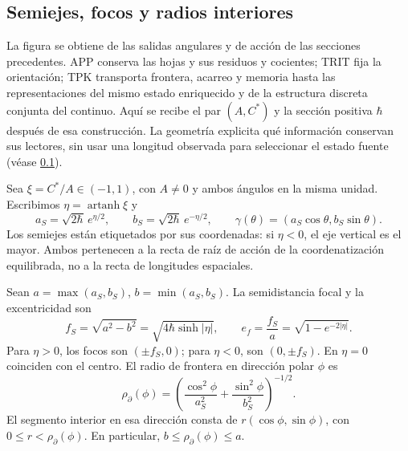 
\subsection{Semiejes, focos y radios interiores}
\label{sec:ii-elipse-geometria}

La figura se obtiene de las salidas angulares y de acción de las secciones
precedentes. APP conserva las hojas y sus residuos y cocientes; TRIT fija
la orientación; TPK transporta frontera, acarreo y memoria hasta las
representaciones del mismo estado enriquecido y de la estructura discreta
conjunta del continuo. Aquí se recibe el par \((A,C^*)\) y la sección
positiva \(\hbar\) después de esa construcción. La geometría explicita
qué información conservan sus lectores, sin usar una longitud observada
para seleccionar el estado fuente (véase \ref{sec:ii-elipse-geometria}).

Sea \(\xi=C^*/A\in(-1,1)\), con \(A\ne0\) y ambos ángulos en la
misma unidad. Escribimos \(\eta=\operatorname{artanh}\xi\) y
\[
 a_S=\sqrt{2\hbar}\,e^{\eta/2},\qquad
 b_S=\sqrt{2\hbar}\,e^{-\eta/2},\qquad
 \gamma(\theta)=(a_S\cos\theta,b_S\sin\theta).
\]
Los semiejes están etiquetados por sus coordenadas: si \(\eta<0\),
el eje vertical es el mayor. Ambos pertenecen a la recta de raíz de
acción de la coordenatización equilibrada, no a la recta de longitudes espaciales.

\begin{proposition}
\label{prop:ii-elipse-focos}
Sean \(a=\max(a_S,b_S)\), \(b=\min(a_S,b_S)\). La semidistancia
focal y la excentricidad son
\begin{equation}
 f_S=\sqrt{a^2-b^2}
 =\sqrt{4\hbar\sinh|\eta|},\qquad
 e_f=\frac{f_S}{a}=\sqrt{1-e^{-2|\eta|}}.
 \label{eq:ii-elipse-focal}
\end{equation}
Para \(\eta>0\), los focos son \((\pm f_S,0)\); para
\(\eta<0\), son \((0,\pm f_S)\). En \(\eta=0\) coinciden con
el centro. El radio de frontera en dirección polar \(\phi\) es
\begin{equation}
 \rho_{\partial}(\phi)
 =\left(\frac{\cos^2\phi}{a_S^2}
        +\frac{\sin^2\phi}{b_S^2}\right)^{-1/2}.
 \label{eq:ii-elipse-radio-polar}
\end{equation}
El segmento interior en esa dirección consta de
\(r(\cos\phi,\sin\phi)\), con \(0\le r<\rho_{\partial}(\phi)\).
En particular, \(b\le\rho_{\partial}(\phi)\le a\).
\end{proposition}

